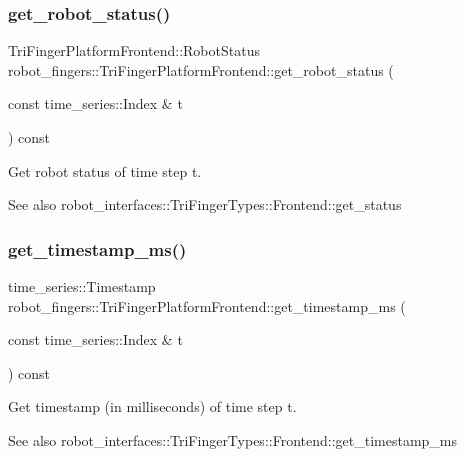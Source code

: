 \subsubsection{\texorpdfstring{get\+\_\+robot\+\_\+status()}{get\_robot\_status()}}
{\footnotesize\ttfamily Tri\+Finger\+Platform\+Frontend\+::\+Robot\+Status robot\+\_\+fingers\+::\+Tri\+Finger\+Platform\+Frontend\+::get\+\_\+robot\+\_\+status (\begin{DoxyParamCaption}\item[{const time\+\_\+series\+::\+Index \&}]{t }\end{DoxyParamCaption}) const}



Get robot status of time step t. 

\begin{DoxySeeAlso}{See also}
robot\+\_\+interfaces\+::\+Tri\+Finger\+Types\+::\+Frontend\+::get\+\_\+status 
\end{DoxySeeAlso}
\mbox{\label{classrobot__fingers_1_1TriFingerPlatformFrontend_abf6ed97b5f5711058030733fb283aad6}} 
\subsubsection{\texorpdfstring{get\+\_\+timestamp\+\_\+ms()}{get\_timestamp\_ms()}}
{\footnotesize\ttfamily time\+\_\+series\+::\+Timestamp robot\+\_\+fingers\+::\+Tri\+Finger\+Platform\+Frontend\+::get\+\_\+timestamp\+\_\+ms (\begin{DoxyParamCaption}\item[{const time\+\_\+series\+::\+Index \&}]{t }\end{DoxyParamCaption}) const}



Get timestamp (in milliseconds) of time step t. 

\begin{DoxySeeAlso}{See also}
robot\+\_\+interfaces\+::\+Tri\+Finger\+Types\+::\+Frontend\+::get\+\_\+timestamp\+\_\+ms 
\end{DoxySeeAlso}
\mbox{\label{classrobot__fingers_1_1TriFingerPlatformFrontend_a0dc8d9e0d6e26053194e223ac29fc8c4}} 
